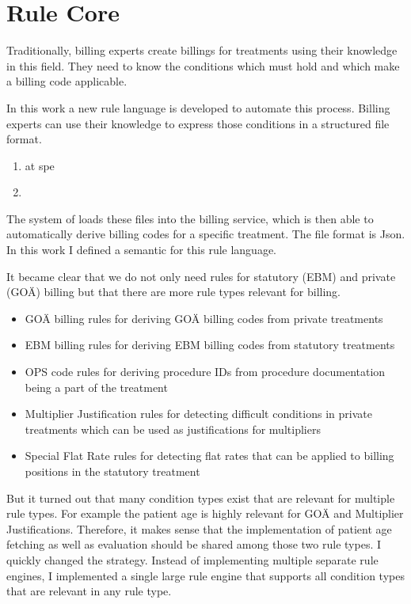 \section{Rule Core}

Traditionally, billing experts create billings for treatments using their knowledge in this field.
They need to know the conditions which must hold and which make a billing code applicable.

In this work a new rule language is developed to automate this process.
Billing experts can use their knowledge to express those conditions in a structured file format.




\begin{enumerate}
    \item \Me at \AV spe
    \item
\end{enumerate}



The system of \AV loads these files into the billing service, which is then able to automatically derive billing codes for a specific treatment.
The file format is Json.
In this work I defined a semantic for this rule language.

It became clear that we do not only need rules for statutory (EBM) and private (GOÄ) billing but that there are more rule types relevant for billing.

\begin{itemize}
    \item GOÄ billing rules for deriving GOÄ billing codes from private treatments
    \item EBM billing rules for deriving EBM billing codes from statutory treatments
    \item OPS code rules for deriving procedure IDs from procedure documentation being a part of the treatment
    \item Multiplier Justification rules for detecting difficult conditions in private treatments which can be used as justifications for multipliers
    \item Special Flat Rate rules for detecting flat rates that can be applied to billing positions in the statutory treatment
\end{itemize}

But it turned out that many condition types exist that are relevant for multiple rule types.
For example the patient age is highly relevant for GOÄ and Multiplier Justifications.
Therefore, it makes sense that the implementation of patient age fetching as well as evaluation should be shared among those two rule types.
I quickly changed the strategy.
Instead of implementing multiple separate rule engines, I implemented a single large rule engine that supports all condition types that are relevant in any rule type.



